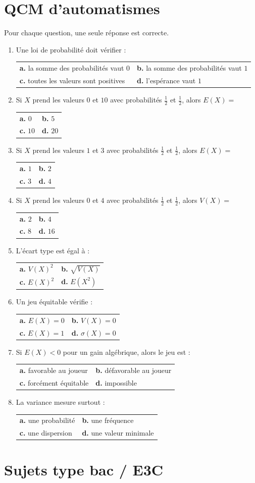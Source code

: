 \documentclass[11pt,a4paper]{article}
\makeatletter
\newcounter{question}
\newcommand{\qcm}[4]{%
\begin{center}\begin{tabularx}{0.96\linewidth}{@{}XX@{}}
\textbf{a.} #1 & \textbf{b.} #2\\[1mm]
\textbf{c.} #3 & \textbf{d.} #4
\end{tabularx}\end{center}}
\makeatother
\begin{document}
\section{QCM d'automatismes}
Pour chaque question, une seule réponse est correcte.
\begin{enumerate}
\item Une loi de probabilité doit vérifier :
\qcm{la somme des probabilités vaut $0$}{la somme des probabilités vaut $1$}{toutes les valeurs sont positives}{l'espérance vaut $1$}
\item Si $X$ prend les valeurs $0$ et $10$ avec probabilités $\frac12$ et $\frac12$, alors $E(X)=$
\qcm{$0$}{$5$}{$10$}{$20$}
\item Si $X$ prend les valeurs $1$ et $3$ avec probabilités $\frac12$ et $\frac12$, alors $E(X)=$
\qcm{$1$}{$2$}{$3$}{$4$}
\item Si $X$ prend les valeurs $0$ et $4$ avec probabilités $\frac12$ et $\frac12$, alors $V(X)=$
\qcm{$2$}{$4$}{$8$}{$16$}
\item L'écart type est égal à :
\qcm{$V(X)^2$}{$\sqrt{V(X)}$}{$E(X)^2$}{$E(X^2)$}
\item Un jeu équitable vérifie :
\qcm{$E(X)=0$}{$V(X)=0$}{$E(X)=1$}{$\sigma(X)=0$}
\item Si $E(X)<0$ pour un gain algébrique, alors le jeu est :
\qcm{favorable au joueur}{défavorable au joueur}{forcément équitable}{impossible}
\item La variance mesure surtout :
\qcm{une probabilité}{une fréquence}{une dispersion}{une valeur minimale}
\end{enumerate}

\section{Sujets type bac / E3C}
\end{document}
